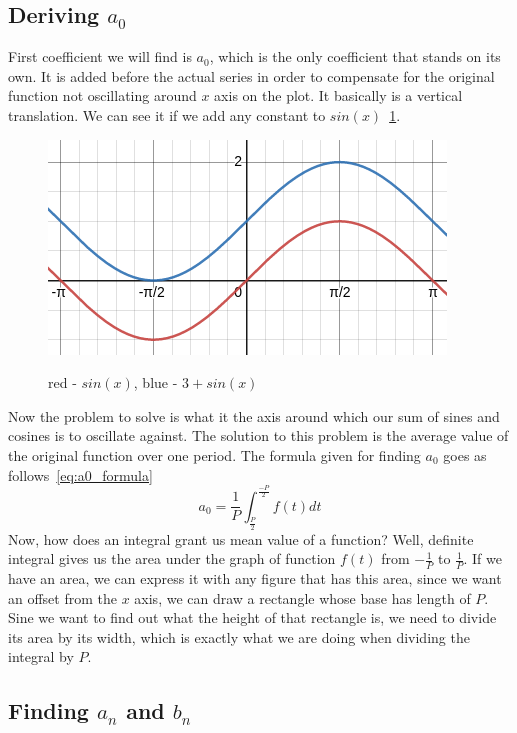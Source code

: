 \documentclass{article}
\begin{document}
\subsection{Deriving $a_0$}
    
    First coefficient we will find is $a_0$, which is the only coefficient that 
    stands on its own. It is added before the actual series in order to compensate
    for the original function not oscillating around $x$ axis on the plot. It 
    basically is a vertical translation. We can see it if we add any constant
    to $sin(x)$~\ref{fig:sine_translation}.
    \begin{figure}[H]
        \caption{red - $sin(x)$, blue - $3 + sin(x)$}
        \centering
        \includegraphics[width=0.5\linewidth]{translated_vanilla_sinewave}
        \label{fig:sine_translation}
    \end{figure}
    Now the problem to solve is what it the axis around which our sum of sines
    and cosines is to oscillate against. The solution to this problem is the average
    value of the original function over one period. The formula given for finding
    $a_0$ goes as follows~\eqref{eq:a0_formula}
    \begin{equation}\label{eq:a0_formula}
        a_0 = \frac{1}{P}\int_{\frac{P}{2}}^{\frac{-P}{2}}f(t)dt
    \end{equation}
    Now, how does an integral grant us mean value of a function? Well, definite
    integral gives us the area under the graph of function $f(t)$ from 
    $-\frac{1}{P}$ to $\frac{1}{P}$. If we have an area, we can express it with 
    any figure that has this area, since we want an offset from the $x$ axis, 
    we can draw a rectangle whose base has length of $P$. Sine we want to find
    out what the height of that rectangle is, we need to divide its area by its
    width, which is exactly what we are doing when dividing the integral by $P$.

\subsection{Finding $a_n$ and $b_n$}
\end{document}
